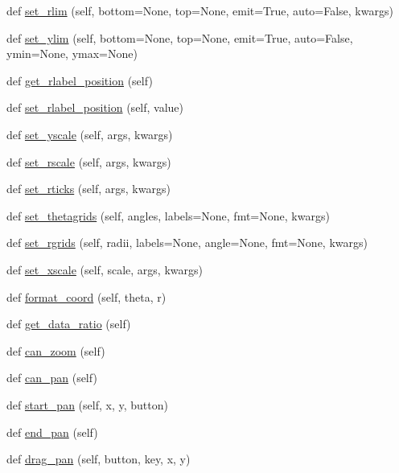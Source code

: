 \begin{DoxyCompactItemize}
def \hyperlink{classmatplotlib_1_1projections_1_1polar_1_1PolarAxes_ae7838693fa81e830d5ba18ad144d08d7}{set\+\_\+rlim} (self, bottom=None, top=None, emit=True, auto=False, kwargs)
\item 
def \hyperlink{classmatplotlib_1_1projections_1_1polar_1_1PolarAxes_aaa4e368650c1a3df262b78464478f85e}{set\+\_\+ylim} (self, bottom=None, top=None, emit=True, auto=False, ymin=None, ymax=None)
\item 
def \hyperlink{classmatplotlib_1_1projections_1_1polar_1_1PolarAxes_a49cffc330d9684edd0f159571b5fb485}{get\+\_\+rlabel\+\_\+position} (self)
\item 
def \hyperlink{classmatplotlib_1_1projections_1_1polar_1_1PolarAxes_a5f8fa9103ae550a399366e61eb7b8c36}{set\+\_\+rlabel\+\_\+position} (self, value)
\item 
def \hyperlink{classmatplotlib_1_1projections_1_1polar_1_1PolarAxes_a67af0bf942e2a32f949126f39789550d}{set\+\_\+yscale} (self, args, kwargs)
\item 
def \hyperlink{classmatplotlib_1_1projections_1_1polar_1_1PolarAxes_a34cb6761ccada2ddd37c48f0877a7ac7}{set\+\_\+rscale} (self, args, kwargs)
\item 
def \hyperlink{classmatplotlib_1_1projections_1_1polar_1_1PolarAxes_a329dda8c5f04c8392a25321dae73a778}{set\+\_\+rticks} (self, args, kwargs)
\item 
def \hyperlink{classmatplotlib_1_1projections_1_1polar_1_1PolarAxes_aba18ea7e01d14da38ab6b755642e256b}{set\+\_\+thetagrids} (self, angles, labels=None, fmt=None, kwargs)
\item 
def \hyperlink{classmatplotlib_1_1projections_1_1polar_1_1PolarAxes_a0b0f075aa2b3f3bf6754441395ccf5c8}{set\+\_\+rgrids} (self, radii, labels=None, angle=None, fmt=None, kwargs)
\item 
def \hyperlink{classmatplotlib_1_1projections_1_1polar_1_1PolarAxes_ab427058f1f681e32fe1a3442d6199586}{set\+\_\+xscale} (self, scale, args, kwargs)
\item 
def \hyperlink{classmatplotlib_1_1projections_1_1polar_1_1PolarAxes_a314c40ca5c09662cb4ddec5cfbbeace6}{format\+\_\+coord} (self, theta, r)
\item 
def \hyperlink{classmatplotlib_1_1projections_1_1polar_1_1PolarAxes_aa066354e4327d99143d7a402bcb3633d}{get\+\_\+data\+\_\+ratio} (self)
\item 
def \hyperlink{classmatplotlib_1_1projections_1_1polar_1_1PolarAxes_a4b83eec5651da5a801157107fd0d7f01}{can\+\_\+zoom} (self)
\item 
def \hyperlink{classmatplotlib_1_1projections_1_1polar_1_1PolarAxes_ad741ee103b833a17966bec12ac794667}{can\+\_\+pan} (self)
\item 
def \hyperlink{classmatplotlib_1_1projections_1_1polar_1_1PolarAxes_aeff38b4b12256b83bff7fe5621b27c54}{start\+\_\+pan} (self, x, y, button)
\item 
def \hyperlink{classmatplotlib_1_1projections_1_1polar_1_1PolarAxes_aa5ba82c2f56937c58ed6a576a291b964}{end\+\_\+pan} (self)
\item 
def \hyperlink{classmatplotlib_1_1projections_1_1polar_1_1PolarAxes_a2227c2c761c457a50bc250f824baa692}{drag\+\_\+pan} (self, button, key, x, y)
\end{DoxyCompactItemize}
